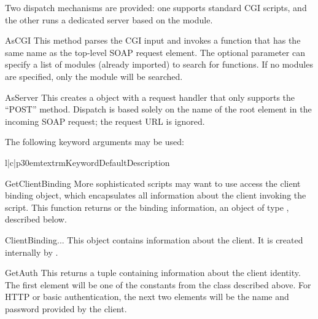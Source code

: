 Two dispatch mechanisms are provided: one supports standard CGI
scripts, and the other runs a dedicated server based on the
 module.

\begin{methoddesc}{AsCGI}{}
This method parses the CGI input and invokes a function that has the
same name as the top-level SOAP request element.
The optional  parameter can specify a list of modules
(already imported) to search for functions.
If no modules are specified, only the  module will be searched.
\end{methoddesc}

\begin{methoddesc}{AsServer}{}
This creates a  object with a request handler that only
supports the ``POST'' method.
Dispatch is based solely on the name of the root element in the
incoming SOAP request;
the request URL is ignored.

The following keyword arguments may be used:

\begin{tableiii}{l|c|p{30em}}{textrm}{Keyword}{Default}{Description}
\end{tableiii}

\end{methoddesc}

\begin{methoddesc}{GetClientBinding}{}
More sophisticated scripts may want to use access the client binding object,
which encapsulates all information about the client invoking the script.
This function returns  or the binding information, an
object of type , described below.
\end{methoddesc}

\begin{classdesc}{ClientBinding}{...}
This object contains information about the client.
It is created internally by \ZSI{}.
\end{classdesc}

\begin{methoddesc}{GetAuth}{}
This returns a tuple containing information about the client identity.
The first element will be one of the constants from the  class
described above.
For HTTP or \ZSI{} basic authentication, the next two elements will be
the name and password provided by the client.
\end{methoddesc}

